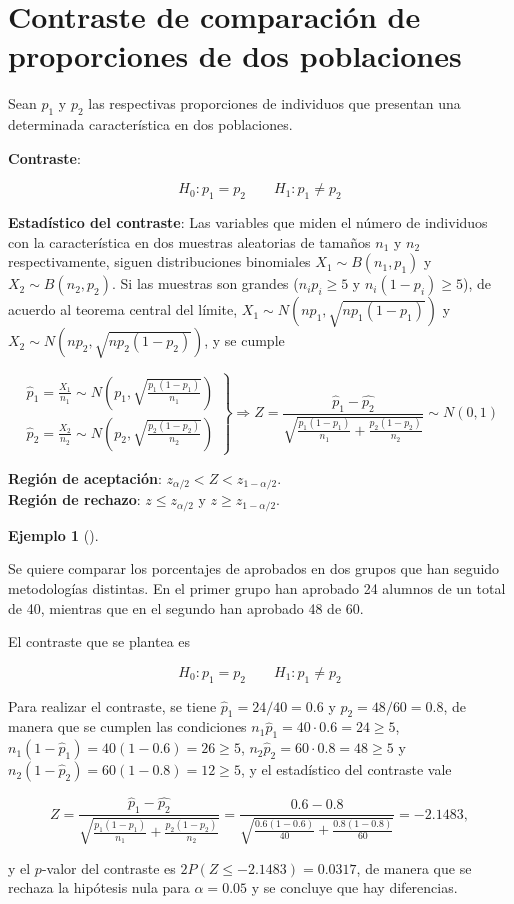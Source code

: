 \documentclass[
  a4paper,
]{scrreport}
\theoremstyle{plain}
\theoremstyle{definition}
\theoremstyle{definition}
\newtheorem{example}{Ejemplo}[chapter]
\theoremstyle{remark}
\begin{document}
\section{Contraste de comparación de proporciones de dos
poblaciones}\label{contraste-de-comparaciuxf3n-de-proporciones-de-dos-poblaciones}

Sean \(p_1\) y \(p_2\) las respectivas proporciones de individuos que
presentan una determinada característica en dos poblaciones.

\textbf{Contraste}:

\[
H_0: p_1=p_2\qquad H_1: p_1\neq p_2
\]

\textbf{Estadístico del contraste}: Las variables que miden el número de
individuos con la característica en dos muestras aleatorias de tamaños
\(n_1\) y \(n_2\) respectivamente, siguen distribuciones binomiales
\(X_1\sim B(n_1,p_1)\) y \(X_2\sim B(n_2,p_2)\). Si las muestras son
grandes (\(n_ip_i\geq 5\) y \(n_i(1-p_i)\geq 5\)), de acuerdo al teorema
central del límite, \(X_1\sim N(np_1,\sqrt{np_1(1-p_1)})\) y
\(X_2\sim N(np_2,\sqrt{np_2(1-p_2)})\), y se cumple

\[
\left.
\begin{array}{l}
\hat{p}_1=\frac{X_1}{n_1} \sim N\left(p_1,\sqrt{\frac{p_1(1-p_1)}{n_1}}\right) \\
\hat{p}_2=\frac{X_2}{n_2} \sim N\left(p_2,\sqrt{\frac{p_2(1-p_2)}{n_2}}\right)
\end{array}
\right\}
\Rightarrow Z = \frac{\hat{p}_1-\hat{p_2}}{\sqrt{\frac{p_1(1-p_1)}{n_1}+\frac{p_2(1-p_2)}{n_2}}}\sim N(0,1)
\]

\textbf{Región de aceptación}: \(z_{\alpha/2}< Z < z_{1-\alpha/2}\).\\
\textbf{Región de rechazo}: \(z\leq z_{\alpha/2}\) y
\(z\geq z_{1-\alpha/2}\).

\begin{example}[]\protect\hypertarget{exm-contraste-diferencia-proporciones}{}\label{exm-contraste-diferencia-proporciones}

Se quiere comparar los porcentajes de aprobados en dos grupos que han
seguido metodologías distintas. En el primer grupo han aprobado 24
alumnos de un total de 40, mientras que en el segundo han aprobado 48 de
60.

El contraste que se plantea es

\[
H_0: p_1=p_2\qquad H_1: p_1\neq p_2
\]

Para realizar el contraste, se tiene \(\hat{p}_1=24/40= 0.6\) y
\(\hat{p}_2=48/60=0.8\), de manera que se cumplen las condiciones
\(n_1\hat{p}_1=40\cdot 0.6=24\geq 5\),
\(n_1(1-\hat{p}_1)=40(1-0.6)=26\geq 5\),
\(n_2\hat{p}_2=60\cdot 0.8=48\geq 5\) y
\(n_2(1-\hat{p}_2)=60(1-0.8)=12\geq 5\), y el estadístico del contraste
vale

\[
Z = \frac{\hat{p}_1-\hat{p_2}}{\sqrt{\frac{p_1(1-p_1)}{n_1}+\frac{p_2(1-p_2)}{n_2}}} = \frac{0.6-0.8}{\sqrt{\frac{0.6(1-0.6)}{40}+\frac{0.8(1-0.8)}{60}}} = -2.1483,
\]

y el \(p\)-valor del contraste es \(2P(Z\leq -2.1483)= 0.0317\), de
manera que se rechaza la hipótesis nula para \(\alpha=0.05\) y se
concluye que hay diferencias.

\end{example}
\end{document}
